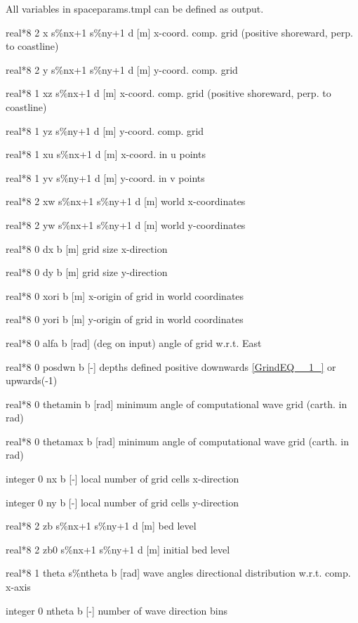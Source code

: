 All variables in spaceparams.tmpl can be defined as output. 



real*8  2  x  s\%nx+1 s\%ny+1  d    [m]        x-coord. comp. grid (positive shoreward, perp. to coastline)

real*8  2  y  s\%nx+1 s\%ny+1  d    [m]        y-coord. comp. grid

real*8  1  xz s\%nx+1 d    [m]        x-coord. comp. grid (positive shoreward, perp. to coastline)

real*8  1  yz s\%ny+1 d    [m]        y-coord. comp. grid

real*8  1  xu s\%nx+1  d    [m]        x-coord. in u points

real*8  1  yv s\%ny+1  d    [m]        y-coord. in v points

real*8  2  xw s\%nx+1 s\%ny+1  d    [m]        world x-coordinates

real*8  2  yw s\%nx+1 s\%ny+1  d    [m]        world y-coordinates

real*8  0  dx   b    [m]        grid size x-direction

real*8  0  dy   b    [m]        grid size y-direction

real*8  0  xori b    [m]        x-origin of grid in world coordinates

real*8  0  yori b    [m]        y-origin of grid in world coordinates

real*8  0  alfa b    [rad]      (deg on input) angle of grid w.r.t. East

real*8  0  posdwn b  [-]        depths defined positive downwards \eqref{GrindEQ__1_} or upwards(-1)

real*8  0  thetamin b  [rad]      minimum angle of computational wave grid (carth. in rad)

real*8  0  thetamax b  [rad]      minimum angle of computational wave grid (carth. in rad)

integer 0  nx     b  [-]        local number of grid cells x-direction

integer 0  ny     b  [-]        local number of grid cells y-direction

real*8  2  zb     s\%nx+1 s\%ny+1 d  [m]        bed level

real*8  2  zb0    s\%nx+1 s\%ny+1 d  [m]        initial bed level

real*8  1  theta  s\%ntheta b  [rad]      wave angles directional distribution w.r.t. comp. x-axis

integer 0  ntheta b  [-]        number of wave direction bins

